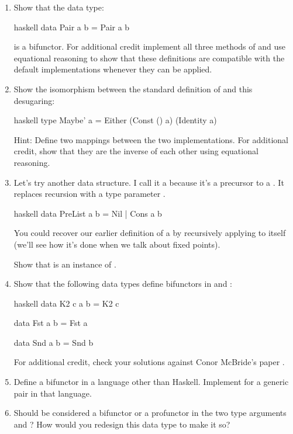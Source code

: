 \begin{enumerate}
  \tightlist
  \item
        Show that the data type:

        \begin{snip}{haskell}
data Pair a b = Pair a b
\end{snip}

        is a bifunctor. For additional credit implement all three methods of
         and use equational reasoning to show that these
        definitions are compatible with the default implementations whenever
        they can be applied.
  \item
        Show the isomorphism between the standard definition of 
        and this desugaring:

        \begin{snip}{haskell}
type Maybe' a = Either (Const () a) (Identity a)
\end{snip}

        Hint: Define two mappings between the two implementations. For
        additional credit, show that they are the inverse of each other using
        equational reasoning.
  \item
        Let's try another data structure. I call it a  because
        it's a precursor to a . It replaces recursion with a type
        parameter .

        \begin{snip}{haskell}
data PreList a b = Nil | Cons a b
\end{snip}

        You could recover our earlier definition of a  by
        recursively applying  to itself (we'll see how it's
        done when we talk about fixed points).

        Show that  is an instance of .
  \item
        Show that the following data types define bifunctors in  and
        :

        \begin{snip}{haskell}
data K2 c a b = K2 c

data Fst a b = Fst a

data Snd a b = Snd b
\end{snip}

        For additional credit, check your solutions against Conor McBride's
        paper .
  \item
        Define a bifunctor in a language other than Haskell. Implement
         for a generic pair in that language.
  \item
        Should  be considered a bifunctor or a profunctor in
        the two type arguments  and ? How would you
        redesign this data type to make it so?
\end{enumerate}
